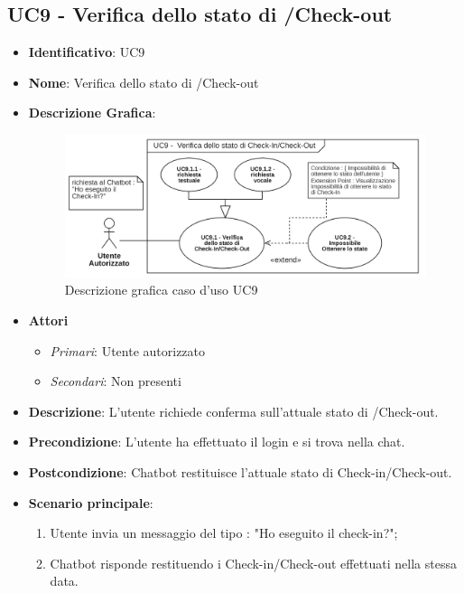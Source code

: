 \subsection{UC9 - Verifica dello stato di /Check-out}
\begin{itemize}
	\item \textbf{Identificativo}: UC9
	\item \textbf{Nome}: Verifica dello stato di /Check-out
	\item\textbf{Descrizione Grafica}: 
	
	\begin{figure}[h]
		\centering
		\includegraphics[scale=0.60]{images/UC9.png} 
		\caption{Descrizione grafica caso d'uso UC9}
	 \end{figure}

	\item \textbf{Attori}
	\begin{itemize} 
		\item \textit{Primari}: Utente autorizzato
		\item \textit{Secondari}: Non presenti
	\end{itemize}
	\item \textbf{Descrizione}: L'utente richiede conferma sull'attuale stato di /Check-out.
	\item \textbf{Precondizione}: L'utente ha effettuato il login e si trova nella chat.
	\item \textbf{Postcondizione}: Chatbot restituisce l'attuale stato di Check-in/Check-out.
	\item \textbf{Scenario principale}:  \begin{enumerate}
		\item Utente invia un messaggio del tipo : "Ho eseguito il check-in?";
		\item Chatbot risponde restituendo i Check-in/Check-out effettuati nella stessa data.
	\end{enumerate}
\end{itemize}

